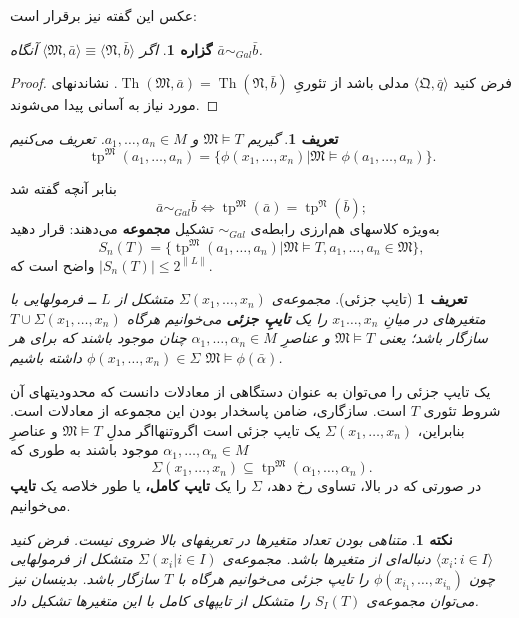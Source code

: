\documentclass[12pt,a4paper]{report}
\theoremstyle{colorhead}
\newtheorem{prop}[thm]{گزاره}
\newtheorem{defn}[thm]{تعریف}
\newtheorem{nokte}[thm]{نکته}
\DeclareMathOperator{\Th}{Th}
\DeclareMathOperator{\tp}{tp}
\begin{document}
عکس این گفته نیز برقرار است:
\begin{prop}
اگر
$\langle \mathfrak{M},\bar{a}\rangle\equiv\langle \mathfrak{N},\bar{b}\rangle$
آنگاه
$\bar{a}\sim_{Gal}\bar{b}$.
\end{prop}
\begin{proof}
فرض کنید
$\langle \mathfrak{Q},\bar{q}\rangle$
مدلی باشد از تئوریِ
$\Th(\mathfrak{M},\bar{a})=\Th(\mathfrak{N},\bar{b})$.
نشاندنهای مورد نیاز به آسانی پیدا می‌شوند.
\end{proof}
\begin{defn}
گیریم 
$\mathfrak{M}\models T$
و
$a_1,\ldots,a_n\in M$.
تعریف می‌کنیم
\[
\tp^\mathfrak{M}(a_1,\ldots,a_n)=\{\phi(x_1,\ldots,x_n)|\mathfrak{M}\models
\phi(a_1,\ldots,a_n)\}.
\]
\end{defn}
بنابر آنچه گفته شد
\[
\bar{a}\sim_{Gal}\bar{b}\Leftrightarrow \tp^\mathfrak{M}(\bar{a})
=\tp^\mathfrak{N}(\bar{b});
\]
به‌ويژه کلاسهای هم‌ارزی رابطه‌ی 
$\sim_{Gal}$
تشکیل
\textbf{ مجموعه}
 می‌دهند: قرار دهید
 \[
 S_n(T)=\{\tp^\mathfrak{M}(a_1,\ldots,a_n)|
 \mathfrak{M}\models T, a_1,\ldots, a_n\in \mathfrak{M}\},
 \]
 واضح است که
 $|S_n(T)|\leq 2^{\|L\|}$.
\begin{defn}[تایپ جزئی]
مجموعه‌ی
$\Sigma(x_1,\ldots,x_n)$
متشکل از
$L$
ــ 
فرمولهایی با متغیرهای در میانِ
$x_1\ldots,x_n$
را 
یک
\textbf{تایپِ جزئی}
می‌خوانیم هرگاه
$T\cup \Sigma(x_1,\ldots,x_n)$
سازگار باشد؛ یعنی
$\mathfrak{M}\models T$
و عناصرِ
$\alpha_1,\ldots,\alpha_n\in M$
چنان موجود باشند که برای هر
$\phi(x_1,\ldots,x_n)\in \Sigma$
داشته باشیم
$\mathfrak{M}\models \phi(\bar{\alpha})$.
\end{defn}
یک تایپ جزئی را می‌توان به عنوان دستگاهی از معادلات دانست که محدودیتهای آن شروط تئوری
$T$
است. سازگاری، ضامن پاسخدار بودن این مجموعه از معادلات است. بنابراین،
$\Sigma(x_1,\ldots,x_n)$
یک تایپ جزئی است اگروتنهااگر مدلِ
$\mathfrak{M}\models T$
و عناصرِ
$\alpha_1,\ldots,\alpha_n\in M$
موجود باشند به طوری که
\[
\Sigma(x_1,\ldots,x_n)\subseteq \tp^\mathfrak{M}(\alpha_1,\ldots,\alpha_n).
\]
در صورتی که در بالا، تساوی رخ دهد، 
$\Sigma$
را یک
\textbf{تایپ کامل،}
 یا طور خلاصه یک 
\textbf{ تایپ}
  می‌خوانیم.
\begin{nokte}
متناهی بودن تعداد متغیرها در تعریفهای بالا ضروی نیست. فرض کنید
$\langle x_i:i\in I\rangle$
دنباله‌ای از متغیرها باشد. مجموعه‌ی
$\Sigma(x_i|i\in I)$
متشکل از فرمولهایی چون
$\phi(x_{i_1},\ldots,x_{i_n})$
را تایپ جزئی می‌خوانیم هرگاه با
$T$
سازگار باشد.
بدینسان
نیز می‌توان
مجموعه‌ی
$S_I(T)$
را
متشکل از تایپهای کامل با این متغیرها  تشکیل داد. 
\end{nokte}
\end{document}
